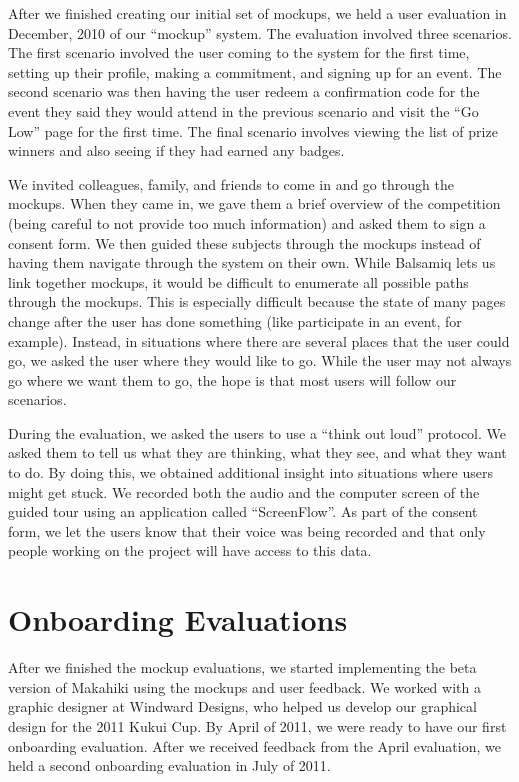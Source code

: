 After we finished creating our initial set of mockups, we held a user evaluation in December, 2010 of our ``mockup'' system.  The evaluation involved three scenarios.  The first scenario involved the user coming to the system for the first time, setting up their profile, making a commitment, and signing up for an event.  The second scenario was then having the user redeem a confirmation code for the event they said they would attend in the previous scenario and visit the ``Go Low'' page for the first time.  The final scenario involves viewing the list of prize winners and also seeing if they had earned any badges.

We invited colleagues, family, and friends to come in and go through the mockups.  When they came in, we gave them a brief overview of the competition (being careful to not provide too much information) and asked them to sign a consent form.  We then guided these subjects through the mockups instead of having them navigate through the system on their own.  While Balsamiq lets us link together mockups, it would be difficult to enumerate all possible paths through the mockups.  This is especially difficult because the state of many pages change after the user has done something (like participate in an event, for example).  Instead, in situations where there are several places that the user could go, we asked the user where they would like to go.  While the user may not always go where we want them to go, the hope is that most users will follow our scenarios.

During the evaluation, we asked the users to use a ``think out loud'' protocol.  We asked them to tell us what they are thinking, what they see, and what they want to do.  By doing this, we obtained additional insight into situations where users might get stuck.  We recorded both the audio and the computer screen of the guided tour using an application called ``ScreenFlow''.  As part of the consent form, we let the users know that their voice was being recorded and that only people working on the project will have access to this data. 

\section{Onboarding Evaluations}
\label{eval-onboarding}

After we finished the mockup evaluations, we started implementing the beta version of Makahiki using the mockups and user feedback.  We worked with a graphic designer at Windward Designs, who helped us develop our graphical design for the 2011 Kukui Cup.  By April of 2011, we were ready to have our first onboarding evaluation.  After we received feedback from the April evaluation, we held a second onboarding evaluation in July of 2011.

